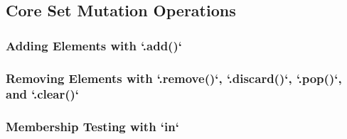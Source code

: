 \subsection{Core Set Mutation Operations}
\subsubsection{Adding Elements with `.add()`}
\subsubsection{Removing Elements with `.remove()`, `.discard()`, `.pop()`, and `.clear()`}
\subsubsection{Membership Testing with `in`}
